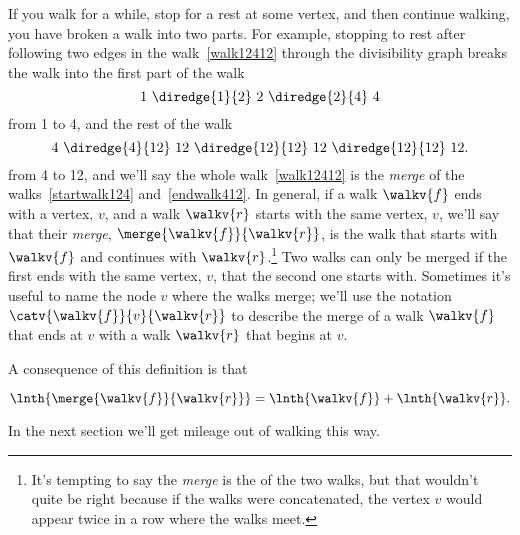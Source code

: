 If you walk for a while, stop for a rest at some vertex, and then
continue walking, you have broken a walk into two parts.  For example,
stopping to rest after following two edges in the walk~\eqref{walk12412}
through the divisibility graph breaks the walk into the first part of the walk
\begin{equation}\label{startwalk124}
1\ \diredge{1}{2}\  2\  \diredge{2}{4}\  4
\end{equation}
from 1 to 4, and the rest of the walk
\begin{equation}\label{endwalk412}
4\ \diredge{4}{12}\  12\  \diredge{12}{12}\  12\ \diredge{12}{12}\  12.
\end{equation}
from 4 to 12, and we'll say the whole walk~\eqref{walk12412} is the
\emph{merge}%
of the walks~\eqref{startwalk124} and~\eqref{endwalk412}.
In general, if a walk $\walkv{f}$ ends with a vertex, $v$, and a walk
$\walkv{r}$ starts with the same vertex, $v$, we'll say that their
\emph{merge}, $\merge{\walkv{f}}{\walkv{r}}$, is the walk that starts
with $\walkv{f}$ and continues with $\walkv{r}$.\footnote{It's
  tempting to say the \emph{merge} is the  of the
  two walks, but that wouldn't quite be right because if the walks
  were concatenated, the vertex $v$ would appear twice in a row where
  the walks meet.}  Two walks can only be merged if the first ends
with the same vertex, $v$, that the second one starts with.  Sometimes
it's useful to name the node $v$ where the walks merge; we'll use the
notation $\catv{\walkv{f}}{v}{\walkv{r}}$ to describe the merge of a
walk $\walkv{f}$ that ends at $v$ with a walk $\walkv{r}$ that begins
at $v$.

\iffalse
 Here's a precise definition:
\begin{definition}
If a walk $\walkv{f}$ ends at a vertex $v$ and a walk $\walkv{r}$
begins at the same vertex $v$, then the \term{$v$-merge} of
$\walkv{f}$ with $\walkv{r}$, written,
\[
\catv{\walkv{f}}{v}{\walkv{r}},
\]
is the walk whose vertex sequence is the vertex sequence of
$\walkv{f}$ concatenated with the vertex sequence of $\walkv{r}$
without its initial $v$.  That is, if
\begin{align*}
\walkv{r} & = v\,\vec{\alpha},
\end{align*}
for some finite sequence $\vec{\alpha}$ of vertices,
then
\[
\catv{\walkv{f}}{v}{\walkv{r}} \eqdef  \walkv{f}\alpha.
\]
\end{definition}
\fi

A consequence of this definition is that
\begin{lemma}\label{sumoflengths}
\[
\lnth{\merge{\walkv{f}}{\walkv{r}}} = \lnth{\walkv{f}} + \lnth{\walkv{r}}.
\]
\end{lemma}
In the next section we'll get mileage out of walking this way.

